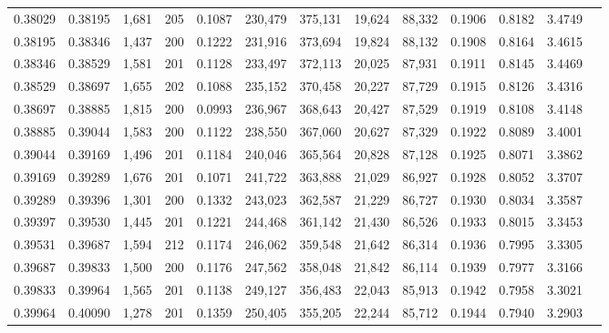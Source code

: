 \begin{tabular}{rrrrrrrrrrrrr}
0.38029 & 0.38195 & 1,681 & 205 &                                     0.1087 & 230,479 & 375,131 &  19,624 &  88,332 & 0.1906 & 0.8182 & 3.4749 \\
0.38195 & 0.38346 & 1,437 & 200 &                                     0.1222 & 231,916 & 373,694 &  19,824 &  88,132 & 0.1908 & 0.8164 & 3.4615 \\
0.38346 & 0.38529 & 1,581 & 201 &                                     0.1128 & 233,497 & 372,113 &  20,025 &  87,931 & 0.1911 & 0.8145 & 3.4469 \\
0.38529 & 0.38697 & 1,655 & 202 &                                     0.1088 & 235,152 & 370,458 &  20,227 &  87,729 & 0.1915 & 0.8126 & 3.4316 \\
0.38697 & 0.38885 & 1,815 & 200 &                                     0.0993 & 236,967 & 368,643 &  20,427 &  87,529 & 0.1919 & 0.8108 & 3.4148 \\
0.38885 & 0.39044 & 1,583 & 200 &                                     0.1122 & 238,550 & 367,060 &  20,627 &  87,329 & 0.1922 & 0.8089 & 3.4001 \\
0.39044 & 0.39169 & 1,496 & 201 &                                     0.1184 & 240,046 & 365,564 &  20,828 &  87,128 & 0.1925 & 0.8071 & 3.3862 \\
0.39169 & 0.39289 & 1,676 & 201 &                                     0.1071 & 241,722 & 363,888 &  21,029 &  86,927 & 0.1928 & 0.8052 & 3.3707 \\
0.39289 & 0.39396 & 1,301 & 200 &                                     0.1332 & 243,023 & 362,587 &  21,229 &  86,727 & 0.1930 & 0.8034 & 3.3587 \\
0.39397 & 0.39530 & 1,445 & 201 &                                     0.1221 & 244,468 & 361,142 &  21,430 &  86,526 & 0.1933 & 0.8015 & 3.3453 \\
0.39531 & 0.39687 & 1,594 & 212 &                                     0.1174 & 246,062 & 359,548 &  21,642 &  86,314 & 0.1936 & 0.7995 & 3.3305 \\
0.39687 & 0.39833 & 1,500 & 200 &                                     0.1176 & 247,562 & 358,048 &  21,842 &  86,114 & 0.1939 & 0.7977 & 3.3166 \\
0.39833 & 0.39964 & 1,565 & 201 &                                     0.1138 & 249,127 & 356,483 &  22,043 &  85,913 & 0.1942 & 0.7958 & 3.3021 \\
0.39964 & 0.40090 & 1,278 & 201 &                                     0.1359 & 250,405 & 355,205 &  22,244 &  85,712 & 0.1944 & 0.7940 & 3.2903 \\

\end{tabular}
